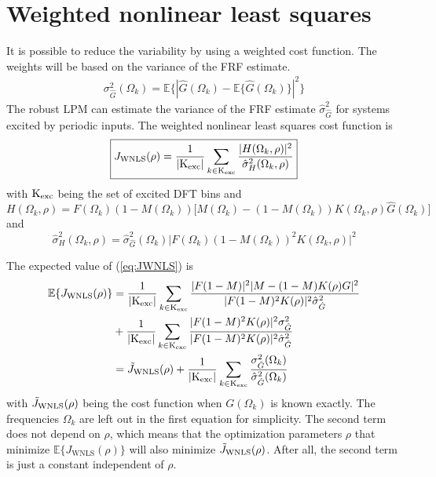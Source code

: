 \section{Weighted nonlinear least squares}
\label{sec:WNLS}
It is possible to reduce the variability by using a weighted cost function. The weights will be based on the variance of the FRF estimate.
\begin{align*}
    \sigma^2_{\hat G}(\Omega_k) = \mathbb{E}\big\{|\hat G(\Omega_k)- \mathbb{E}\{\hat G(\Omega_k)\}|^2\big\} 
\end{align*}
The robust LPM can estimate the variance of the FRF estimate $\hat\sigma^2_{\hat G}$ for systems excited by periodic inputs. The weighted nonlinear least squares cost function is
\begin{equation}
\boxed{
    J_\mathrm{WNLS}(\rho) = \frac{1}{|\text{K}_{\text{exc}}|}\sum_{k \in \text{K}_{\text{exc}}} \frac{|H(\Omega_k,\rho)|^2}{\hat\sigma^2_{H}(\Omega_k,\rho)}}
    \label{eq:JWNLS}
\end{equation}
with $\text{K}_{\text{exc}}$ being the set of excited DFT bins and
\begin{equation*}
    H(\Omega_k,\rho) = F(\Omega_k)(1-M(\Omega_k)) \Big[M(\Omega_k)-(1-M(\Omega_k))K(\Omega_k,\rho) \hat{G}(\Omega_k)\Big]
\end{equation*}
and
\begin{equation*}
\hat\sigma^2_{H}(\Omega_k,\rho) = \hat\sigma^2_{\hat G}(\Omega_k) \Big| F(\Omega_k) (1-M(\Omega_k))^2K(\Omega_k,\rho) \Big|^2
\end{equation*}


The expected value of (\ref{eq:JWNLS}) is
\begin{align*}
\mathbb{E}\{J_\mathrm{WNLS}(\rho)\} &=
 \frac{1}{|\text{K}_{\text{exc}}|} \sum_{k \in \text{K}_{\text{exc}}} \frac{|F(1-M)|^2 |M-(1-M)K(\rho)G|^2}{|F(1-M)^2 K(\rho)|^2 \hat\sigma^2_{\hat G}}\\ 
 &+ \frac{1}{|\text{K}_{\text{exc}}|} \sum_{k \in \text{K}_{\text{exc}}} \frac{|F(1-M)^2 K(\rho)|^2 \sigma^2_{\hat G}}{|F(1-M)^2 K(\rho)|^2 \hat\sigma^2_{\hat G}} \\
&=  \Tilde{J}_\mathrm{WNLS}(\rho) + \frac{1}{|\text{K}_{\text{exc}}|} \sum_{k \in \text{K}_{\text{exc}}} \frac{\sigma^2_{\hat G}(\Omega_k)}{\hat\sigma^2_{\hat G}(\Omega_k)} 
\end{align*}
with $\Tilde{J}_\mathrm{WNLS}(\rho)$ being the cost function when $G(\Omega_k)$ is known exactly. The frequencies $\Omega_k$ are left out in the first equation for simplicity. The second term does not depend on $\rho$, which means that the optimization parameters $\rho$ that minimize $\mathbb{E}\{J_\mathrm{WNLS}(\rho)\}$ will also minimize $\Tilde{J}_\mathrm{WNLS}(\rho)$. After all, the second term is just a constant independent of $\rho$.


